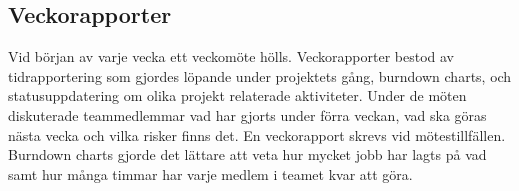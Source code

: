 \subsection{Veckorapporter}
\label{subsec:Lieth-Veckorapporter}
Vid början av varje vecka ett veckomöte hölls. Veckorapporter bestod av tidrapportering som gjordes löpande under projektets 
gång, burndown charts, och statusuppdatering om olika projekt relaterade aktiviteter. Under de möten diskuterade teammedlemmar 
vad har gjorts under förra veckan, vad ska göras nästa vecka och vilka risker finns det. En veckorapport skrevs vid mötestillfällen. 
Burndown charts gjorde det lättare att veta hur mycket jobb har lagts på vad samt hur många timmar har varje medlem i teamet 
kvar att göra. 
